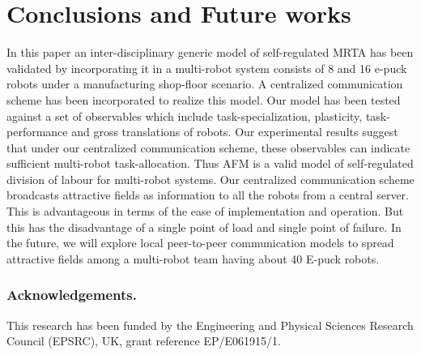 \documentclass[smallcondensed]{svjour3}
\begin{document}
\section{Conclusions and Future works}
\label{sec:conc}
In this paper  an inter-disciplinary generic model of self-regulated MRTA has been validated by incorporating it in a multi-robot system consists of 8 and 16 e-puck robots under a manufacturing shop-floor scenario. A centralized communication scheme has been incorporated to realize this model. Our model has been tested against a set of observables which include task-specialization, plasticity, task-performance and gross translations of robots.  Our experimental results suggest that under our centralized  communication scheme, these observables can indicate sufficient multi-robot task-allocation.  Thus AFM is a valid model of  self-regulated division of labour for multi-robot systems.
Our centralized communication scheme broadcasts attractive fields as information to all the robots from a central server. This is advantageous in terms of the ease of implementation and operation. But this has the disadvantage of a single point of load and single point of failure. In the future, we will explore local peer-to-peer communication models to spread attractive fields among a multi-robot team having about 40 E-puck robots.
\subsubsection*{Acknowledgements. } 
This research has been funded by the Engineering and Physical Sciences Research Council (EPSRC), UK, grant reference EP/E061915/1.
 
%
%
%            
%
\end{document}
